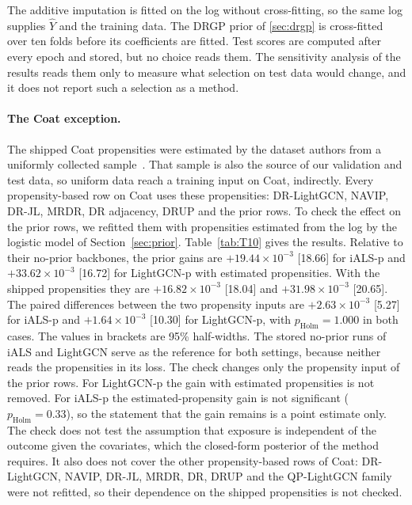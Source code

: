 The additive imputation is fitted on the log without cross-fitting, so the same log supplies $\hat Y$ and the
training data. The DRGP prior of \ref{sec:drgp} is cross-fitted over ten folds before its
coefficients are fitted. Test scores are computed after every epoch and stored, but no choice reads them.
The sensitivity analysis of the results reads them only to measure what selection on test data would
change, and it does not report such a selection as a method.

\paragraph{The Coat exception.}
The shipped Coat propensities were estimated by the dataset authors from a uniformly collected
sample~\citep{schnabel2016}. That sample is also the source of our validation and test data, so uniform
data reach a training input on Coat, indirectly. Every propensity-based row on Coat uses these
propensities: DR-LightGCN, NAVIP, DR-JL, MRDR, DR adjacency, DRUP and the prior rows. To check the effect
on the prior rows, we refitted them with propensities estimated from the log by the logistic model of
Section~\ref{sec:prior}. Table~\ref{tab:T10} gives the results. Relative to their no-prior backbones, the
prior gains are $+19.44\times10^{-3}$ [18.66] for iALS-p and $+33.62\times10^{-3}$ [16.72] for LightGCN-p
with estimated propensities. With the shipped propensities they are $+16.82\times10^{-3}$ [18.04] and
$+31.98\times10^{-3}$ [20.65]. The paired differences between the two propensity inputs are
$+2.63\times10^{-3}$ [5.27] for iALS-p and $+1.64\times10^{-3}$ [10.30] for LightGCN-p, with
$p_\mathrm{Holm}=1.000$ in both cases. The values in brackets are 95\% half-widths. The stored
no-prior runs of iALS and LightGCN serve as the reference for both settings, because neither reads the
propensities in its loss. The check changes only the propensity input of the prior rows. For LightGCN-p the
gain with estimated propensities is not removed. For iALS-p the estimated-propensity gain is not significant
($p_\mathrm{Holm}=0.33$), so the statement that the gain remains is a point estimate only. The check does not
test the assumption that exposure is independent of the outcome given the covariates, which the closed-form
posterior of the method requires. It also does not cover the other propensity-based rows of Coat: DR-LightGCN,
NAVIP, DR-JL, MRDR, DR, DRUP and the QP-LightGCN family were not refitted, so their dependence on the shipped
propensities is not checked.

